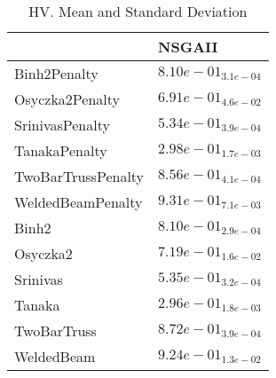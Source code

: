 \documentclass{article}
\begin{document}
\begin{table}
\caption{HV. Mean and Standard Deviation}
\label{table: HV}
\centering
\begin{scriptsize}
\begin{tabular}{ll}
\hline &  NSGAII\\
\hline 
Binh2Penalty & \cellcolor{gray95}$  8.10e-01_{ 3.1e-04}$ \\
Osyczka2Penalty & \cellcolor{gray95}$  6.91e-01_{ 4.6e-02}$ \\
SrinivasPenalty & \cellcolor{gray95}$  5.34e-01_{ 3.9e-04}$ \\
TanakaPenalty & \cellcolor{gray95}$  2.98e-01_{ 1.7e-03}$ \\
TwoBarTrussPenalty & \cellcolor{gray95}$  8.56e-01_{ 4.1e-04}$ \\
WeldedBeamPenalty & \cellcolor{gray95}$  9.31e-01_{ 7.1e-03}$ \\
Binh2 & \cellcolor{gray95}$  8.10e-01_{ 2.9e-04}$ \\
Osyczka2 & \cellcolor{gray95}$  7.19e-01_{ 1.6e-02}$ \\
Srinivas & \cellcolor{gray95}$  5.35e-01_{ 3.2e-04}$ \\
Tanaka & \cellcolor{gray95}$  2.96e-01_{ 1.8e-03}$ \\
TwoBarTruss & \cellcolor{gray95}$  8.72e-01_{ 3.9e-04}$ \\
WeldedBeam & \cellcolor{gray95}$  9.24e-01_{ 1.3e-02}$ \\
\hline
\end{tabular}
\end{scriptsize}
\end{table}
\end{document}
